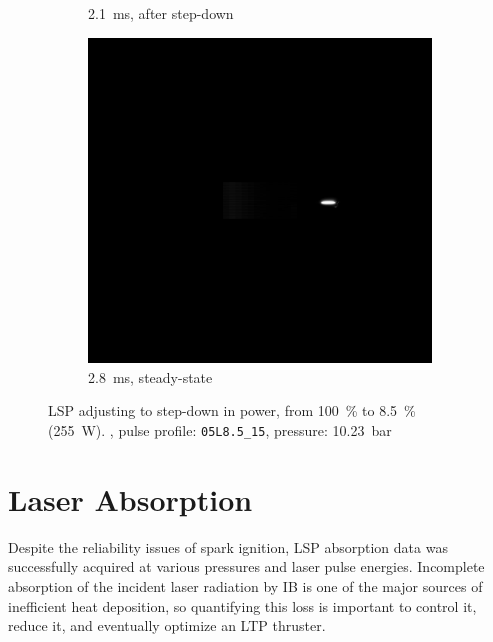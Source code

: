 \begin{figure}[h]
\begin{subfigure}[t]{0.32\textwidth}
                    \caption{\qty{2.1}{ms}, after step-down}
                    \label{fig:lsp_stepdown_21}
                \end{subfigure}
                \hfill
                \begin{subfigure}[t]{0.32\textwidth}
                    \centering
                    \includegraphics[trim=7.6in 5.3in 2.4in 5.5in, clip, width=\textwidth]{assets/5 results/LSP34_PS28/28.jpg}
                    \caption{\qty{2.8}{ms}, steady-state}
                    \label{fig:lsp_stepdown_28}
                \end{subfigure}
                \caption[LSP adjusting to step-down in power]{LSP adjusting to step-down in power, from 100~\% to 8.5~\% (\qty{255}{W}). , pulse profile: \texttt{05L8.5\_15}, pressure: \qty{10.23}{bar}}
                \label{fig:lsp_stepdown}
            \end{figure}

    \clearpage
    \section{Laser Absorption} \label{sec:exp_absorption}
        Despite the reliability issues of spark ignition, LSP absorption data was successfully acquired at various pressures and laser pulse energies. Incomplete absorption of the incident laser radiation by IB is one of the major sources of inefficient heat deposition, so quantifying this loss is important to control it, reduce it, and  eventually optimize an LTP thruster.
        
